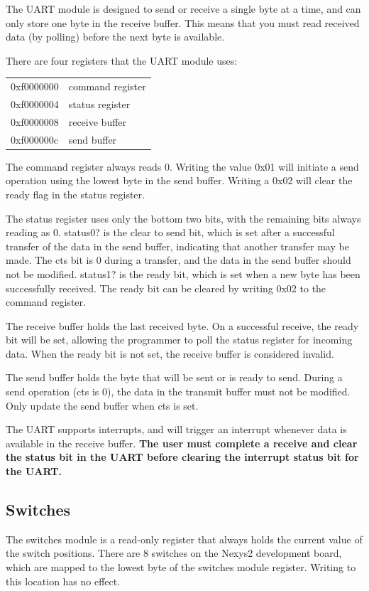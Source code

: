 \documentclass{article}
\begin{document}
The UART module is designed to send or receive a single byte at a time, and can only store one byte in the receive buffer. This means that you must read received data (by polling) before the next byte is available.

There are four registers that the UART module uses: 

\begin{tabular}{ | l | l | }
\hline
0xf0000000 & command register \\
0xf0000004 & status register \\
0xf0000008 & receive buffer \\
0xf000000c & send buffer \\
\hline
\end{tabular}

The command register always reads 0. Writing the value 0x01 will initiate a send operation using the lowest byte in the send buffer. Writing a 0x02 will clear the ready flag in the status register.

The status register uses only the bottom two bits, with the remaining bits always reading as 0. status0? is the clear to send bit, which is set after a successful transfer of the data in the send buffer, indicating that another transfer may be made. The cts bit is 0 during a transfer, and the data in the send buffer should not be modified. status1? is the ready bit, which is set when a new byte has been successfully received. The ready bit can be cleared by writing 0x02 to the command register.

The receive buffer holds the last received byte. On a successful receive, the ready bit will be set, allowing the programmer to poll the status register for incoming data. When the ready bit is not set, the receive buffer is considered invalid.

The send buffer holds the byte that will be sent or is ready to send. During a send operation (cts is 0), the data in the transmit buffer must not be modified. Only update the send buffer when cts is set.

The UART supports interrupts, and will trigger an interrupt whenever data is available in the receive buffer. \textbf{The user must complete a receive and clear the status bit in the UART before clearing the interrupt status bit for the UART.}
\subsection{Switches}
The switches module is a read-only register that always holds the current value of the switch positions. There are 8 switches on the Nexys2 development board, which are mapped to the lowest byte of the switches module register. Writing to this location has no effect. 
\end{document}
